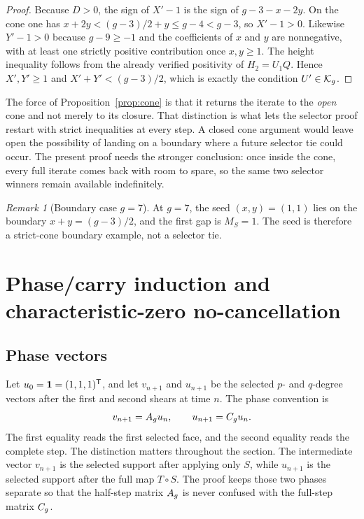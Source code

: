 \documentclass[11pt]{article}
\theoremstyle{remark}
\newtheorem{remark}[theorem]{Remark}
\numberwithin{equation}{section}
\begin{document}
\begin{proof}
Because \(D>0\), the sign of \(X'-1\) is the sign of \(g-3-x-2y\).  On the
cone one has \(x+2y<(g-3)/2+y\leq g-4<g-3\), so \(X'-1>0\).  Likewise
\(Y'-1>0\) because \(g-9\geq -1\) and the coefficients of \(x\) and \(y\) are
nonnegative, with at least one strictly positive contribution once \(x,y\geq
1\).  The height inequality follows from the already verified positivity of
\(H_2=U_1Q\).  Hence \(X',Y'\geq 1\) and \(X'+Y'<(g-3)/2\), which is exactly
the condition \(U'\in \mathcal{K}_g\).
\end{proof}

The force of Proposition~\ref{prop:cone} is that it returns the iterate to the
\emph{open} cone and not merely to its closure.  That distinction is what lets
the selector proof restart with strict inequalities at every step.  A closed
cone argument would leave open the possibility of landing on a boundary where a
future selector tie could occur.  The present proof needs the stronger
conclusion: once inside the cone, every full iterate comes back with room to
spare, so the same two selector winners remain available indefinitely.

\begin{remark}[Boundary case \(g=7\)]\label{rem:g7}
At \(g=7\), the seed \((x,y)=(1,1)\) lies on the boundary
\(x+y=(g-3)/2\), and the first gap is \(M_S=1\).  The seed is therefore a
strict-cone boundary example, not a selector tie.
\end{remark}

\section{Phase/carry induction and characteristic-zero no-cancellation}\label{sec:induction}

\subsection{Phase vectors}\label{sec:phase}

Let \(u_0=\mathbf{1}=(1,1,1)^{\mathsf T}\), and let \(v_{n+1}\) and \(u_{n+1}\) be the
selected \(p\)- and \(q\)-degree vectors after the first and second shears at
time \(n\).  The phase convention is
\[
v_{n+1}=A_g u_n,\qquad u_{n+1}=C_g u_n.
\]
The first equality reads the first selected face, and the second equality reads
the complete step.  The distinction matters throughout the section.  The
intermediate vector \(v_{n+1}\) is the selected support after applying only
\(S\), while \(u_{n+1}\) is the selected support after the full map \(T\circ S\).
The proof keeps those two phases separate so that the half-step matrix
\(A_g\) is never confused with the full-step matrix \(C_g\).
\end{document}
